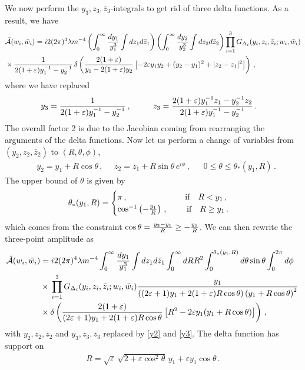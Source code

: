 \documentclass[12pt]{article}
\numberwithin{equation}{section}
\def\e{{\varepsilon}}
\begin{document}
 We now perform the $y_3,z_3,\bar z_3$-integrals to get rid of three delta functions. As a result, we have
\begin{align}
&\mathcal{ \tilde A}(w_i,\bar w_i)  =i 2(2\pi)^4\lambda m^{-4}\left(\int_0^\infty   {dy_1\over y_1^3} \int dz_1d\bar z_1\right)
\left(\int_0^\infty   {dy_2\over y_2^{3}} \int dz_2d\bar z_2\right)\prod_{i=1}^3 G_{\Delta_i} (y_i , z_i,\bar z_i ; w_i,\bar w_i)\notag\\
&\times
{1\over 2(1+\e) y_1^{-1} -y_2^{-1}}  \, 
\delta\left({2(1+\e)\over y_1-2(1+\e) y_2}\left[ -2\e y_1y_2+ (y_2-y_1)^2  +|z_2-z_1|^2\right]\right)\,,
\end{align}
where we have replaced
\begin{align}\label{y3}
&y_3 = {1\over 2(1+\e) y_1^{-1} -y_2^{-1}}\,,~~~~~~~~
z_3  = {2(1+\e)y_1^{-1} z_1 -y_2^{-1}  z_2 \over 2(1+\e)y_1^{-1} -y_2^{-1}}\,.
\end{align}
The overall factor 2 is due to the Jacobian coming from  rearranging the arguments of the delta functions. 
Now let us perform a change of variables from $(y_2,z_2,\bar z_2)$ to $(R,\theta, \phi)$,
\begin{align}\label{y2}
&y_2= y_1 + R\cos\theta\,,~~~~~~
z_2= z_1 + R \sin\theta \, e^{i\phi}\,,~~~~~~~0\le \theta \le \theta_*(y_1,R)\,.
\end{align}
The upper bound of $\theta$ is given by
\begin{align}
\theta_*(y_1,R)=
\begin{cases}
\pi\,, ~~~~~~~~~~~~~~~~~~~~~\text{if}~~~R<y_1\,,\\
\cos^{-1} \left( -{y_1\over R}\right)\,,~~~~~~~\text{if}~~~R\ge y_1\,.
\end{cases}
\end{align}
which comes from the constraint $\cos\theta = {y_2 -y_1 \over R } \ge - {y_1\over R}$.  
We can then rewrite the three-point amplitude as
\begin{align}
\mathcal{ \tilde A}(w_i,\bar w_i)  &= i 2(2\pi)^4\lambda m^{-4} \int_0^\infty   {dy_1\over y_1^{3}} \int dz_1d\bar z_1
\int_0^\infty  dR R^2  \int_0^{\theta_*(y_1,R)} d\theta \sin\theta \int_0^{2\pi} d\phi 
 \notag\\
&\times \, 
\prod_{i=1}^3 G_{\Delta_i} (y_i , z_i,\bar z_i ;w_i,\bar w_i)
 {y_1 \over \left(  ( 2\e+1) y_1  +2(1+\e) R\cos\theta\right) 
 \left( y_1 +R\cos\theta \right)^2
 } \, 
 \notag\\
 &
\times\delta\left({2(1+\e)\over 
( 2\e+1) y_1  +2(1+\e) R\cos\theta
}\left[ R^2 -2\e y_1(y_1+R\cos\theta)\right]\right)\,,
\end{align}
with $y_2,z_2,\bar z_2$ and $y_3, z_3,\bar z_3$ replaced by \eqref{y2} and \eqref{y3}.
The delta function has support on
\begin{align}
R= \sqrt{\e}  \,\sqrt{2 +\e\cos^2\theta}\, y_1 +\e y_1\cos\theta \,.
\end{align}
\end{document}
